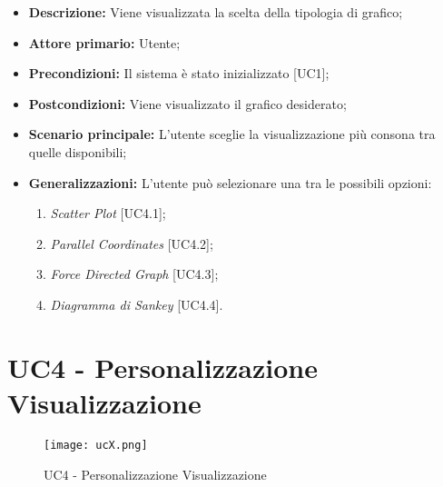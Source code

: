  \begin{itemize}
     \item \textbf{Descrizione:} Viene visualizzata la scelta della tipologia di grafico;
     \item \textbf{Attore primario:} Utente;
     \item \textbf{Precondizioni:} Il sistema è stato inizializzato [UC1];
     \item \textbf{Postcondizioni:} Viene visualizzato il grafico desiderato;
     \item \textbf{Scenario principale:} L'utente sceglie la visualizzazione più consona tra quelle disponibili;
     \item \textbf{Generalizzazioni:} L'utente può selezionare una tra le possibili opzioni:
     \begin{enumerate}
         \item \textit{Scatter Plot} [UC4.1];
         \item \textit{Parallel Coordinates} [UC4.2];
         \item \textit{Force Directed Graph} [UC4.3];
         \item \textit{Diagramma di Sankey} [UC4.4].
     \end{enumerate}
 \end{itemize}


\section{UC4 - Personalizzazione Visualizzazione}

\begin{figure}[h]
  \centering
  \texttt{[image: ucX.png]}
  \caption{UC4 - Personalizzazione Visualizzazione}
\end{figure}

